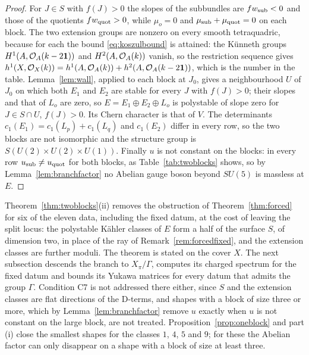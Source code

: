 \begin{proof}
For $J\in S$ with $f(J)>0$ the slopes of the subbundles are
$fw_{\rm sub}<0$ and those of the quotients $fw_{\rm quot}>0$, while
$\mu_o=0$ and $\mu_{\rm sub}+\mu_{\rm quot}=0$ on each block. The two
extension groups are nonzero on every smooth tetraquadric, because for each
the bound \eqref{eq:koszulbound} is attained: the K\"unneth groups
$H^1(A,\mathcal{O}_A(k-2\mathbf{1}))$ and $H^2(A,\mathcal{O}_A(k))$ vanish, so the restriction
sequence gives $h^1(X,\mathcal{O}_X(k))=h^1(A,\mathcal{O}_A(k))+h^2(A,\mathcal{O}_A(k-2\mathbf{1}))$,
which is the number in the table. Lemma~\ref{lem:wall}, applied to each
block at $J_0$, gives a neighbourhood $U$ of $J_0$ on which both $E_1$ and
$E_2$ are stable for every $J$ with $f(J)>0$; their slopes and that of
$L_o$ are zero, so $E=E_1\oplus E_2\oplus L_o$ is polystable of slope zero
for $J\in S\cap U$, $f(J)>0$. Its Chern character is that of $V$. The
determinants $c_1(E_1)=c_1(L_p)+c_1(L_q)$ and $c_1(E_2)$ differ in every
row, so the two blocks are not isomorphic and the structure group is
$S(U(2)\times U(2)\times U(1))$. Finally $u$ is not constant on the
blocks: in every row $u_{\rm sub}\ne u_{\rm quot}$ for both blocks, as
Table~\ref{tab:twoblocks} shows, so by Lemma~\ref{lem:branchfactor} no
Abelian gauge boson beyond $SU(5)$ is massless at $E$.
\end{proof}

\begin{remark}\label{rem:extscope}
Theorem~\ref{thm:twoblocks}(ii) removes the obstruction of
Theorem~\ref{thm:forced} for six of the eleven data, including the fixed
datum, at the cost of leaving the split locus: the polystable K\"ahler
classes of $E$ form a half of the surface $S$, of dimension two, in place
of the ray of Remark~\ref{rem:forcedfixed}, and the extension classes are
further moduli. The theorem is stated on the cover $X$. The next
subsection descends the branch to $X_\pi/\Gamma$, computes its charged
spectrum for the fixed datum and bounds its Yukawa matrices for every
datum that admits the group $\Gamma$. Condition C7 is not addressed there
either, since $S$ and the extension classes are flat directions of the
D-terms, and shapes with a block of size three or more, which by
Lemma~\ref{lem:branchfactor} remove $u$ exactly when $u$ is not constant
on the large block, are not treated. Proposition~\ref{prop:oneblock} and
part (i) close the smallest shapes for the classes $1$, $4$, $5$ and $9$;
for these the Abelian factor can only disappear on a shape with a block of
size at least three.
\end{remark}

